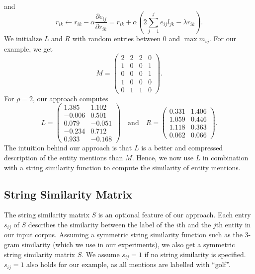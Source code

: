 \documentclass{llncs}
\begin{document}
and
\begin{equation}
r_{ik} \leftarrow r_{ik} - \alpha \frac{\partial e_{ij}}{\partial r_{ik}} = r_{ik} + \alpha \left(2 \sum\limits_{j=1}^j e_{ij}l_{jk} - \lambda r_{ik} \right).
\end{equation}
We initialize $L$ and $R$ with random entries between 0 and $\max m_{ij}$.
For our example, we get
\begin{equation}
M = \left(
\begin{matrix}
 2 & 2 & 2 & 0 \\
 1 & 0 & 0 & 1 \\
 0 & 0 & 0 & 1 \\
 1 & 0 & 0 & 0 \\
 0 & 1 & 1 & 0
\end{matrix} \right).
\end{equation}
For $\rho=2$, our approach computes
\begin{equation}
L = \left(
\begin{matrix}
  1.385 & 1.102 \\
 -0.006 & 0.501  \\
  0.079 & -0.051  \\
 -0.234 & 0.712 \\
  0.933 & -0.168
\end{matrix} \right)
\quad \text{and} \quad R = \left(
\begin{matrix}
 0.331 & 1.406 \\
 1.059 & 0.446 \\
 1.118 & 0.363 \\
 0.062 & 0.066
\end{matrix} \right).
\end{equation}
The intuition behind our approach is that $L$ is a better and compressed description of the entity mentions than $M$.
Hence, we now use $L$ in combination with a string similarity function to compute the similarity of entity mentions.

\subsection{String Similarity Matrix}
The string similarity matrix $S$ is an optional feature of our approach.
Each entry $s_{ij}$ of $S$ describes the similarity between the label of the $i$th and the $j$th entity in our input corpus.
Assuming a symmetric string similarity function such as the 3-gram similarity (which we use in our experiments), 
we also get a symmetric string similarity matrix $S$.
We assume $s_{ij} = 1$ if no string similarity is specified.
$s_{ij} = 1$ also holds for our example, as all mentions are labelled with ``golf''.
\end{document}
